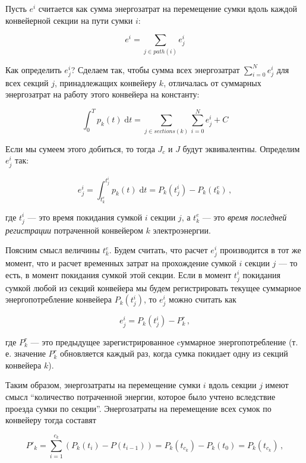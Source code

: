 \documentclass[specification,annotation,times]{itmo-student-thesis}
\theoremstyle{definition}
\begin{document}
Пусть $e^i$ считается как сумма энергозатрат на перемещение сумки вдоль каждой
конвейерной секции на пути сумки $i$:

\begin{equation}
  e^i = \sum\limits_{j \in path(i)} e_j^i
\end{equation}

Как определить $e_j^i$? Сделаем так, чтобы сумма всех энергозатрат
$\sum\limits_{i=0}^N e_j^i$ для всех секций $j$, принадлежащих конвейеру $k$,
отличалась от суммарных энергозатрат на работу этого конвейера на константу:

\begin{equation}\label{eqs:some-equality}
  \int_0^T \! p_k(t) \; \mathrm{d}t = \sum\limits_{j \in sections(k)} \sum\limits_{i=0}^N e_j^i + C
\end{equation}

Если мы сумеем этого добиться, то тогда $J_c$ и $J$ будут эквивалентны.
Определим $e_j^i$ так:

\begin{equation}
  e_j^i = \int_{t_k^e}^{t_j^i} \! p_k(t) \; \mathrm{d}t = P_k(t_j^i) -
  P_k(t_k^e) \,,
\end{equation}

где $t_j^i$ --- это время покидания сумкой $i$ секции $j$, а $t_k^e$ ---
это \textit{время последней регистрации} потраченной конвейером $k$
электроэнергии.

Поясним смысл величины $t_k^e$. Будем считать, что расчет $e_j^i$ производится в
тот же момент, что и расчет временных затрат на прохождение сумкой $i$ секции
$j$ --- то есть, в момент покидания сумкой этой секции. Если в момент $t_j^i$
покидания сумкой любой из секций конвейера мы будем регистрировать текущее
суммарное энергопотребление конвейера $P_k(t_j^i)$, то $e_j^i$ можно считать как

\begin{equation}
  e_j^i = P_k(t_j^i) - P_k^r \,,
\end{equation}

где $P_k^r$ --- это предыдущее зарегистрированное cуммарное энергопотребление
(т. е. значение $P_k^r$ обновляется каждый раз, когда сумка покидает одну из
секций конвейера $k$).

Таким образом, энергозатраты на перемещение сумки $i$ вдоль секции $j$
имеют смысл ``количество потраченной энергии, которое было учтено вследствие
проезда сумки по секции''. Энергозатраты на перемещение всех сумок по конвейеру
тогда составят

\begin{equation}
  P'_k = \sum\limits_{i=1}^{c_k} (P_k(t_i) - P(t_{i-1})) = P_k(t_{c_k}) -
  P_k(t_0) = P_k(t_{c_k}) \,,
\end{equation}
\end{document}
